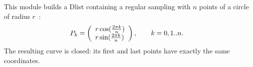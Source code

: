This module builds a Dlist containing a regular sampling with
$n$ points of a circle of radius $r$~:
$$P_k = \left(\begin{array}l r\cos(\frac{2\pi k}n)\\
r\sin(\frac{2\pi k}n)\end{array}\right), \qquad k=0,1..n.$$
The resulting curve is closed: its first and last points have
exactly the same coordinates.

